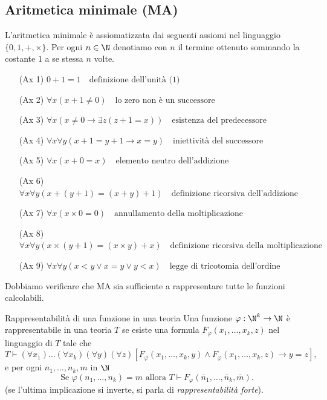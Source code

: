 \documentclass[a4paper,11pt]{report}
\begin{document}
\subsection{Aritmetica minimale (MA)}
L'aritmetica minimale è assiomatizzata dai seguenti assiomi nel linguaggio \( \{0, 1, +, \times\} \). Per ogni \( n\in \N \) denotiamo con \( n \) il termine ottenuto sommando la costante \( 1 \) a se stessa \( n \) volte.

\begin{mdframed}
    \begin{itemize}
        \item[(Ax 1)] \( 0 + 1 = 1 \quad \text{definizione dell'unità (1)} \)
        \item[(Ax 2)] \( \forall x(x + 1 \neq 0) \quad \text{lo zero non è un successore} \)
        \item[(Ax 3)] \( \forall x(x \neq 0 \to \exists z(z + 1 = x)) \quad \text{esistenza del predecessore} \)
        \item[(Ax 4)] \( \forall x\forall y(x + 1 = y + 1 \to x = y) \quad \text{iniettività del successore} \)
        \item[(Ax 5)] \( \forall x(x + 0 = x) \quad \text{elemento neutro dell'addizione} \)
        \item[(Ax 6)] \( \forall x\forall y(x + (y + 1) = (x + y) + 1) \quad \text{definizione ricorsiva dell'addizione} \)
        \item[(Ax 7)] \( \forall x(x \times 0 = 0) \quad \text{annullamento della moltiplicazione} \)
        \item[(Ax 8)] \( \forall x\forall y(x \times (y + 1) = (x \times y) + x) \quad \text{definizione ricorsiva della moltiplicazione} \)
        \item[(Ax 9)] \( \forall x\forall y(x < y \lor x = y \lor y < x) \quad \text{legge di tricotomia dell'ordine} \)
    \end{itemize}
\end{mdframed}

Dobbiamo verificare che MA sia sufficiente a rappresentare tutte le funzioni calcolabili.

\begin{defframe}{Rappresentabilità di una funzione in una teoria}{}
Una funzione \( \varphi : \N^k \to \N \) è rappresentabile in una teoria \( T \) se esiste una formula \( F_{\varphi}(x_1, \dots, x_k, z) \) nel linguaggio di \( T \) tale che
\[
T \vdash (\forall x_1)\dots(\forall x_k)(\forall y)(\forall z)[F_{\varphi}(x_1, \dots, x_k, y) \land F_{\varphi}(x_1, \dots, x_k, z) \to y = z],
\]
e per ogni \( n_1, \dots, n_k, m \) in \( \N \)
\[
\text{Se } \varphi(n_1, \dots, n_k) = m \text{ allora } T \vdash F_{\varphi}(\bar{n}_1, \dots, \bar{n}_k, \bar{m}).
\]
(se l'ultima implicazione si inverte, si parla di \textit{rappresentabilità forte}).
\end{defframe}
\end{document}
